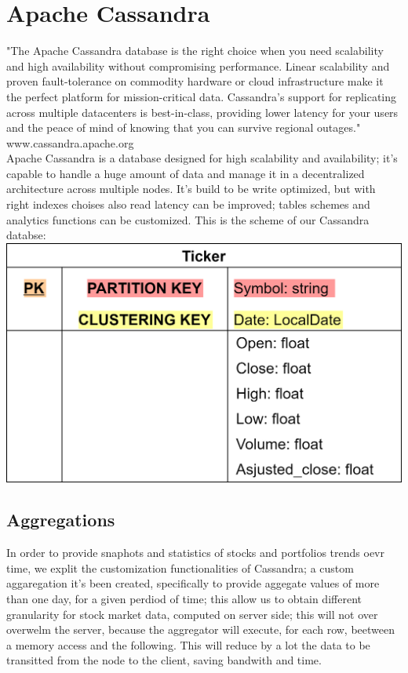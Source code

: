 \section{Apache Cassandra}
"The Apache Cassandra database is the right choice when you need scalability and high 
availability without compromising performance. Linear scalability and proven fault-tolerance 
on commodity hardware or cloud infrastructure make it the perfect platform for mission-critical 
data. Cassandra's support for replicating across multiple datacenters is best-in-class, 
providing lower latency for your users and the peace of mind of knowing that you can survive
regional outages." www.cassandra.apache.org\\
Apache Cassandra is a database designed for high scalability and availability; it's 
capable to handle a huge amount of data and manage it in a decentralized architecture
across multiple nodes. It's build to be write optimized, but with right indexes choises
also read latency can be improved; tables schemes and analytics functions can be customized.
This is the scheme of our Cassandra databse:\\
\includegraphics[scale=0.2]{img/cassandraDB_scheme.png}\\

\subsection{Aggregations}
In order to provide snaphots and statistics of stocks and portfolios trends oevr time,
we explit the customization functionalities of Cassandra; a custom aggaregation it's been 
created, specifically to provide aggegate values of more than one day, for a given
perdiod of time; this allow us to obtain different granularity for stock market data,
computed on server side; this will not over overwelm the server, because the aggregator will
execute, for each row, beetween a memory access and the following. This will reduce by a lot
the data to be transitted from the node to the client, saving bandwith and time.  \\

